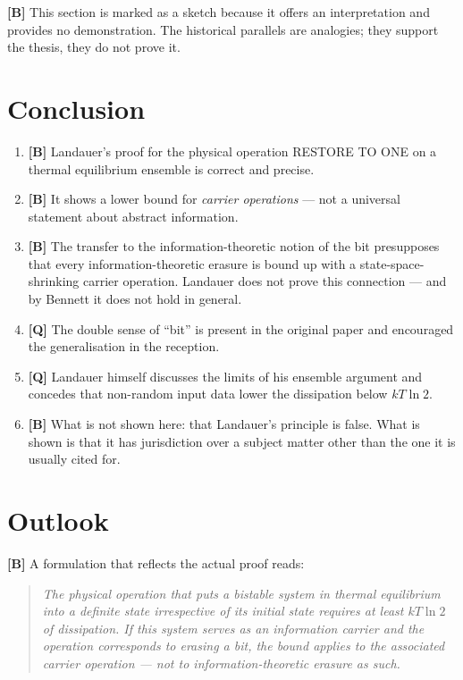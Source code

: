 \textbf{[B]} This section is marked as a sketch because it offers an interpretation and
provides no demonstration. The historical parallels are analogies; they support
the thesis, they do not prove it.

\section{Conclusion}

\begin{enumerate}[leftmargin=1.6em,itemsep=0.35em]
  \item \textbf{[B]} Landauer's proof for the physical operation \textup{RESTORE TO ONE} on
        a thermal equilibrium ensemble is correct and precise.
  \item \textbf{[B]} It shows a lower bound for \emph{carrier operations} --- not a
        universal statement about abstract information.
  \item \textbf{[B]} The transfer to the information-theoretic notion of the bit
        presupposes that every information-theoretic erasure is bound up with a
        state-space-shrinking carrier operation. Landauer does not prove this
        connection --- and by Bennett it does not hold in general.
  \item \textbf{[Q]} The double sense of “bit” is present in the original paper and
        encouraged the generalisation in the reception.
  \item \textbf{[Q]} Landauer himself discusses the limits of his ensemble argument and
        concedes that non-random input data lower the dissipation below
        $kT\ln 2$.
  \item \textbf{[B]} What is not shown here: that Landauer's principle is false. What is
        shown is that it has jurisdiction over a subject matter other than the one
        it is usually cited for.
\end{enumerate}

\section{Outlook}

\textbf{[B]} A formulation that reflects the actual proof reads:

\begin{quote}
\emph{The physical operation that puts a bistable system in thermal equilibrium
into a definite state irrespective of its initial state requires at least
$kT\ln 2$ of dissipation. If this system serves as an information carrier and the
operation corresponds to erasing a bit, the bound applies to the associated
carrier operation --- not to information-theoretic erasure as such.}
\end{quote}

